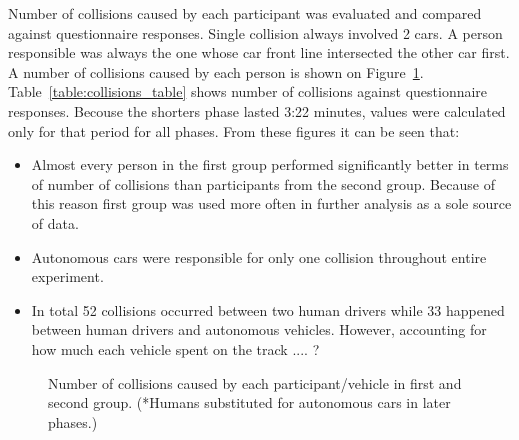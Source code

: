 \documentclass[11pt,english]{article}
\begin{document}
Number of collisions caused by each participant was evaluated and compared against questionnaire responses. Single collision always involved 2 cars. A person responsible was always the one whose car front line intersected the other car first. A number of collisions caused by each person is shown on Figure~\ref{fig:collisions_total}. Table~\ref{table:collisions_table} shows number of collisions against questionnaire responses. Becouse the shorters phase lasted 3:22 minutes, values were calculated only for that period for all phases. From these figures it can be seen that:
\begin{itemize}
  \item Almost every person in the first group performed significantly better in terms of number of collisions than participants from the second group. Because of this reason first group was used more often in further analysis as a sole source of data.
  \item Autonomous cars were responsible for only one collision throughout entire experiment. 
  \item  In total 52 collisions occurred between two human drivers while 33 happened between human drivers and autonomous vehicles. However, accounting for how much each vehicle spent on the track .... ?
\end{itemize}











\begin{figure}[h] %
\caption{Number of collisions caused by each participant/vehicle in first and second group. (*Humans substituted for autonomous cars in later phases.)}
\label{fig:collisions_total}
\end{figure}
\end{document}
